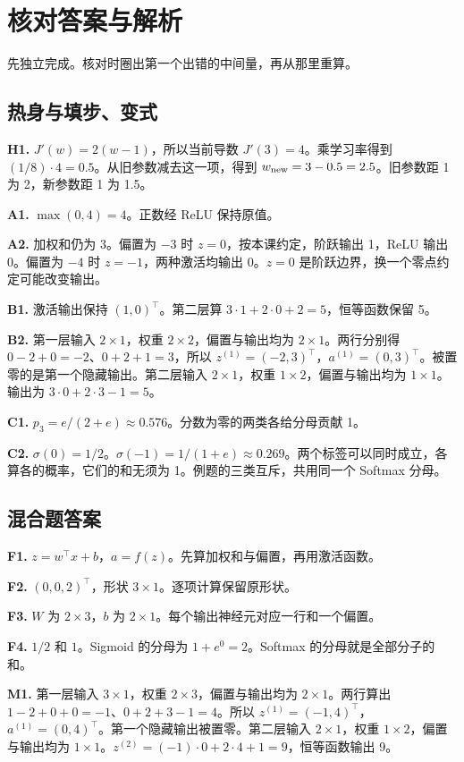 \documentclass[UTF8,a4paper,11pt]{ctexart}
\begin{document}
\section{核对答案与解析}
先独立完成。核对时圈出第一个出错的中间量，再从那里重算。

\subsection{热身与填步、变式}
\textbf{H1.} $J'(w)=2(w-1)$，所以当前导数 $J'(3)=4$。乘学习率得到 $(1/8)\cdot4=0.5$。从旧参数减去这一项，得到 $w_{\rm new}=3-0.5=2.5$。旧参数距 1 为 2，新参数距 1 为 1.5。

\textbf{A1.} $\max(0,4)=4$。正数经 ReLU 保持原值。

\textbf{A2.} 加权和仍为 3。偏置为 $-3$ 时 $z=0$，按本课约定，阶跃输出 1，ReLU 输出 0。偏置为 $-4$ 时 $z=-1$，两种激活均输出 0。$z=0$ 是阶跃边界，换一个零点约定可能改变输出。

\textbf{B1.} 激活输出保持 $(1,0)^\top$。第二层算 $3\cdot1+2\cdot0+2=5$，恒等函数保留 5。

\textbf{B2.} 第一层输入 $2\times1$，权重 $2\times2$，偏置与输出均为 $2\times1$。两行分别得 $0-2+0=-2$、$0+2+1=3$，所以 $z^{(1)}=(-2,3)^\top$，$a^{(1)}=(0,3)^\top$。被置零的是第一个隐藏输出。第二层输入 $2\times1$，权重 $1\times2$，偏置与输出均为 $1\times1$。输出为 $3\cdot0+2\cdot3-1=5$。

\textbf{C1.} $p_3=e/(2+e)\approx0.576$。分数为零的两类各给分母贡献 1。

\textbf{C2.} $\sigma(0)=1/2$。$\sigma(-1)=1/(1+e)\approx0.269$。两个标签可以同时成立，各算各的概率，它们的和无须为 1。例题的三类互斥，共用同一个 Softmax 分母。

\clearpage
\subsection{混合题答案}
\textbf{F1.} $z=w^\top x+b$，$a=f(z)$。先算加权和与偏置，再用激活函数。

\textbf{F2.} $(0,0,2)^\top$，形状 $3\times1$。逐项计算保留原形状。

\textbf{F3.} $W$ 为 $2\times3$，$b$ 为 $2\times1$。每个输出神经元对应一行和一个偏置。

\textbf{F4.} $1/2$ 和 $1$。Sigmoid 的分母为 $1+e^0=2$。Softmax 的分母就是全部分子的和。

\textbf{M1.} 第一层输入 $3\times1$，权重 $2\times3$，偏置与输出均为 $2\times1$。两行算出 $1-2+0+0=-1$、$0+2+3-1=4$。所以 $z^{(1)}=(-1,4)^\top$，$a^{(1)}=(0,4)^\top$。第一个隐藏输出被置零。第二层输入 $2\times1$，权重 $1\times2$，偏置与输出均为 $1\times1$。$z^{(2)}=(-1)\cdot0+2\cdot4+1=9$，恒等函数输出 9。
\end{document}
